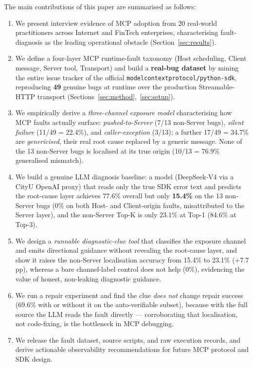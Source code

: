 The main contributions of this paper are summarised as follows:
\begin{enumerate}
  \item We present interview evidence of MCP adoption from 20 real-world practitioners
        across Internet and FinTech enterprises, characterising fault-diagnosis as the
        leading operational obstacle (Section~\ref{sec:results}).
  \item We define a four-layer MCP runtime-fault taxonomy (Host scheduling, Client message,
        Server tool, Transport) and build a \textbf{real-bug dataset} by mining the entire
        issue tracker of the official \verb|modelcontextprotocol/python-sdk|, reproducing
        \textbf{49} genuine bugs at runtime over the production Streamable-HTTP transport
        (Sections~\ref{sec:method},~\ref{sec:setup}).
  \item We empirically derive a \emph{three-channel exposure model} characterising how MCP
        faults actually surface: \emph{pushed-to-Server} (7/13 non-Server bugs),
        \emph{silent failure} (11/49 = 22.4\%), and \emph{caller-exception} (3/13); a further
        17/49 = 34.7\% are \emph{genericised}, their real root cause replaced by a generic
        message. None of the 13 non-Server bugs is localised at its true origin (10/13 = 76.9\%
        generalised mismatch).
  \item We build a genuine LLM diagnosis baseline: a model (DeepSeek-V4 via a CityU OpenAI
        proxy) that reads only the true SDK error text and predicts the root-cause layer
        achieves 77.6\% overall but only \textbf{15.4\%} on the 13 non-Server bugs (0\% on both
        Host- and Client-origin faults, misattributed to the Server layer), and the non-Server
        Top-K is only 23.1\% at Top-1 (84.6\% at Top-3).
  \item We design a \emph{runnable diagnostic-clue tool} that classifies the exposure channel
        and emits directional guidance without revealing the root-cause layer, and show it
        raises the non-Server localisation accuracy from 15.4\% to 23.1\% (+7.7 pp), whereas a
        bare channel-label control does not help (0\%), evidencing the value of honest,
        non-leaking diagnostic guidance.
  \item We run a repair experiment and find the clue \emph{does not} change repair success
        (69.6\% with or without it on the auto-verifiable subset), because with the full source
        the LLM reads the fault directly --- corroborating that localisation, not code-fixing,
        is the bottleneck in MCP debugging.
  \item We release the fault dataset, source scripts, and raw execution records, and derive
        actionable observability recommendations for future MCP protocol and SDK design.
\end{enumerate}

